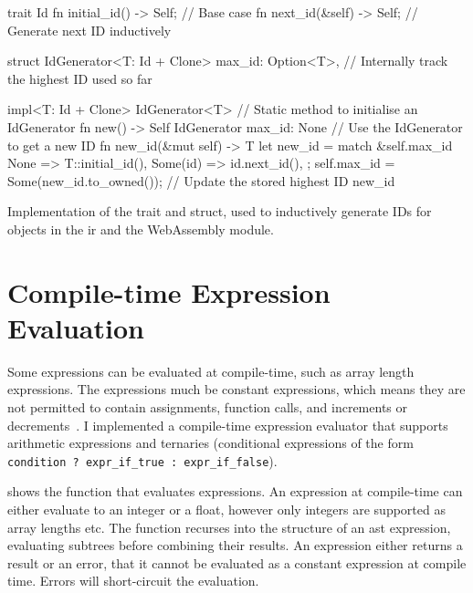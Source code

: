 \documentclass[../00-main.tex]{subfiles}
\begin{document}
\FloatBarrier

\begin{listing}[!t]
  \begin{RustListing}
    trait Id {
        fn initial_id() -> Self;   // Base case
        fn next_id(&self) -> Self; // Generate next ID inductively
    }

    struct IdGenerator<T: Id + Clone> {
        max_id: Option<T>,         // Internally track the highest ID used so far
    }

    impl<T: Id + Clone> IdGenerator<T> {
        // Static method to initialise an IdGenerator
        fn new() -> Self {
            IdGenerator { max_id: None }
        }
        // Use the IdGenerator to get a new ID
        fn new_id(&mut self) -> T {
            let new_id = match &self.max_id {
                None => T::initial_id(),
                Some(id) => id.next_id(),
            };
            self.max_id = Some(new_id.to_owned()); // Update the stored highest ID
            new_id
        }
    }
  \end{RustListing}
  \caption{Implementation of the  trait and  struct, used to inductively generate IDs for objects in the \acrlong{ir} and the WebAssembly module.}
  \label{lst:Id and IdGenerator implementation}
\end{listing}


\section{Compile-time Expression Evaluation}\label{app:sec:compile time expression evaluation}

Some expressions can be evaluated at compile-time, such as array length expressions.
The expressions much be constant expressions, which means they are not permitted to contain assignments, function calls, and increments or decrements~.
I implemented a compile-time expression evaluator that supports arithmetic expressions and ternaries (conditional expressions of the form \texttt{condition~?~expr_if_true~:~expr_if_false}).

 shows the function that evaluates expressions.
An expression at compile-time can either evaluate to an integer or a float, however only integers are supported as array lengths etc.
The  function recurses into the structure of an \gls{ast} expression, evaluating subtrees before combining their results.
An expression either returns a result or an error, that it cannot be evaluated as a constant expression at compile time.
Errors will short-circuit the evaluation.
\end{document}
